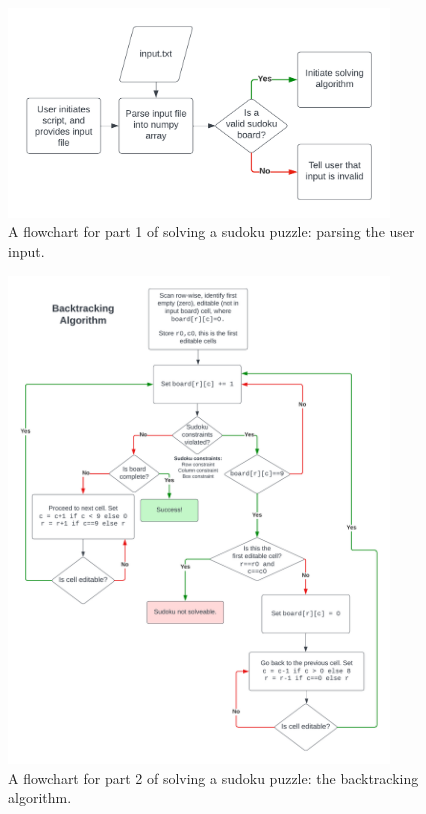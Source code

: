     \begin{figure}[htb]
    \centering
    \includegraphics[width=0.9\textwidth]{./figures/parse-input-prototype}
    \caption{A flowchart for part 1 of solving a sudoku puzzle: parsing the user input.}
    \label{fig:input-prototype}
    \end{figure}

    \begin{figure}[htb]
    \centering
    \includegraphics[width=0.9\textwidth]{./figures/backtracking-prototype}
    \caption{A flowchart for part 2 of solving a sudoku puzzle: the backtracking algorithm.}
    \label{fig:backtracking-prototype}
    \end{figure}

